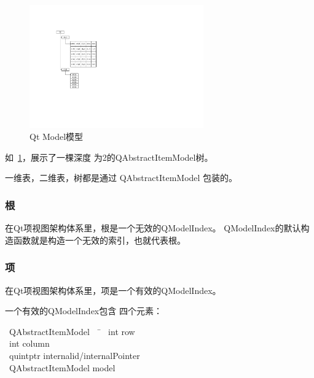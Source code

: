 \begin{figure}[htb] %
\marginnote{\setlength\fboxsep{2pt}\fbox{\footnotesize{\kaishu\figurename\,}\footnotesize{\ref{p000048}}}}\centering %
\includegraphics[width=7.5cm]{chapter10/images/ModelAndIndex.pdf} %
\caption{Qt Model模型} %
\label{p000048} %
\end{figure}


如\figurename\ \ref{p000048}，展示了一棵深度
为2的QAbstractItemModel树。

一维表，二维表，树都是通过
QAbstractItemModel
包装的。

\FloatBarrier
\subsubsection{
根
}\label{c000019s01s03s01}

在Qt项视图架构体系里，根是一个无效的QModelIndex。
QModelIndex的默认构造函数就是构造一个无效的索引，也就代表根。

\FloatBarrier
\subsubsection{
项
}\label{c000019s01s03s02}

在Qt项视图架构体系里，项是一个有效的QModelIndex。

一个有效的QModelIndex包含
四个元素：\begin{tabbing}
\hspace*{\parindent}\textbullet\ QAbstractItemModel \raisebox{-0.35ex}{\sourcefonttwo{}*}  \ \ \= \kill
\hspace*{\parindent}\textbullet\ int                   \> row  \\
\hspace*{\parindent}\textbullet\ int                   \> column  \\
\hspace*{\parindent}\textbullet\ quintptr              \> internalid/internalPointer \\
\hspace*{\parindent}\textbullet\ QAbstractItemModel \raisebox{-0.35ex}{\sourcefonttwo{}*}  \> model 
\end{tabbing}
 
